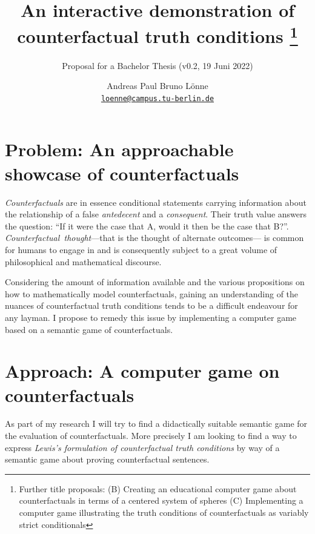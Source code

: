 \documentclass[a4paper,american]{paper}
\providecommand*{\code}[1]{\texttt{#1}}
\begin{document}
\title{An interactive demonstration of counterfactual truth conditions%
	\footnote{Further title proposals:
		(B) Creating an educational computer game about counterfactuals in terms of a centered system of spheres
		(C) Implementing a computer game illustrating the truth conditions of counterfactuals as variably strict conditionals
	}
}

\subtitle{Proposal for a Bachelor Thesis (v0.2, 19 Juni 2022)}

\author{%
	Andreas Paul Bruno Lönne\\
	\code{\href{mailto:loenne@campus.tu-berlin.de}{loenne@campus.tu-berlin.de}}
}


\maketitle

\section*{Problem: An approachable showcase of counterfactuals}
{\it Counterfactuals} are in essence conditional statements carrying information about the relationship of a false {\it antedecent} and a {\it consequent}. Their truth value answers the question: ``If it were the case that A, would it then be the case that B?''. {\it Counterfactual~thought}---that is the thought of alternate outcomes---\cite{byrne_counterfactual_thought_2016} is common for humans to engage in and is consequently subject to a great volume of philosophical and mathematical discourse. 

Considering the amount of information available and the various propositions on how to mathematically model counterfactuals, gaining an understanding of the nuances of counterfactual truth conditions tends to be a difficult endeavour for any layman. I propose to remedy this issue by implementing a computer game based on a semantic game of counterfactuals.

\section*{Approach: A computer game on counterfactuals}
As part of my research I will try to find a didactically suitable semantic game for the evaluation of counterfactuals. More precisely I am looking to find a way to express {\it Lewis's formulation of counterfactual truth conditions} \cite{lewis_counterfactuals_1973} by way of a semantic game about proving counterfactual sentences.
\end{document}

